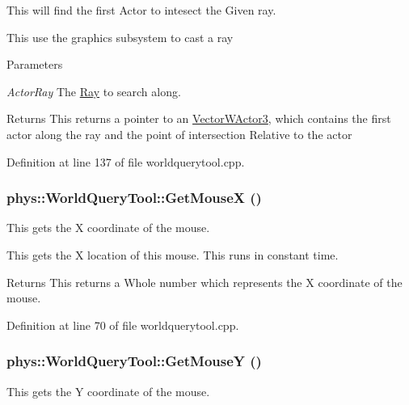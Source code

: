 This will find the first Actor to intesect the Given ray. 

This use the graphics subsystem to cast a ray 
\begin{DoxyParams}{Parameters}
\item[{\em ActorRay}]The \hyperlink{classphys_1_1Ray}{Ray} to search along. \end{DoxyParams}
\begin{DoxyReturn}{Returns}
This returns a pointer to an \hyperlink{classphys_1_1VectorWActor3}{VectorWActor3}, which contains the first actor along the ray and the point of intersection Relative to the actor 
\end{DoxyReturn}


Definition at line 137 of file worldquerytool.cpp.

\hypertarget{classphys_1_1WorldQueryTool_a55721f152fb117fdfb8bc6d20af6b1dc}{
\subsubsection[{GetMouseX}]{ phys::WorldQueryTool::GetMouseX ()}}
\label{d8/d69/classphys_1_1WorldQueryTool_a55721f152fb117fdfb8bc6d20af6b1dc}


This gets the X coordinate of the mouse. 

This gets the X location of this mouse. This runs in constant time. \begin{DoxyReturn}{Returns}
This returns a Whole number which represents the X coordinate of the mouse. 
\end{DoxyReturn}


Definition at line 70 of file worldquerytool.cpp.

\hypertarget{classphys_1_1WorldQueryTool_ac2d8517db7305157c1393320f434751b}{
\subsubsection[{GetMouseY}]{ phys::WorldQueryTool::GetMouseY ()}}
\label{d8/d69/classphys_1_1WorldQueryTool_ac2d8517db7305157c1393320f434751b}


This gets the Y coordinate of the mouse. 

